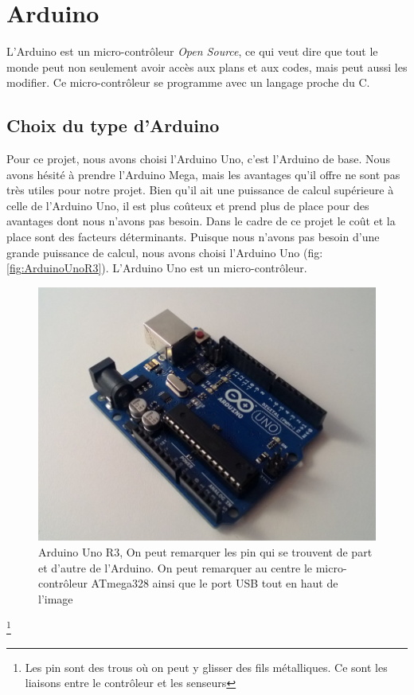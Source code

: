\documentclass[a4paper,11pt]{report}
\begin{document}
{\section{Arduino}
L'Arduino \label{Arduino} \cite{Arduino} est un micro-contrôleur \textit{Open Source}, ce qui veut dire que tout le monde peut non seulement avoir accès aux plans et aux codes, mais peut aussi les modifier. Ce micro-contrôleur se programme avec un langage proche du C. 


\subsection{Choix du type d'Arduino}
Pour ce projet, nous avons choisi l'Arduino Uno, c'est l'Arduino de base.  Nous avons hésité à prendre l'Arduino Mega, mais les avantages qu'il offre ne sont pas très utiles pour notre projet. Bien qu'il ait une puissance de calcul supérieure à celle de l'Arduino Uno, il est plus coûteux et prend plus de place pour des avantages dont nous n'avons pas besoin. Dans le cadre de ce projet le coût et la place sont des facteurs déterminants.  Puisque nous n'avons pas besoin d'une grande puissance de calcul, nous avons choisi l'Arduino Uno (fig: \ref{fig:ArduinoUnoR3}). L'Arduino Uno est un micro-contrôleur.\\

\begin{figure}[h]
\begin{center}
\includegraphics[scale=0.38]{arduino_uno.jpg}
\caption[Arduino Uno R3]{Arduino Uno R3\label{fig:ArduinoUnoR3}, On peut remarquer les pin  \label{pin} qui se trouvent de part et d'autre de l'Arduino. On peut remarquer au centre le micro-contrôleur ATmega328 ainsi que le port USB tout en haut de l'image}
\end{center}
\end{figure}\footnote{Les pin sont des trous où on peut y glisser des fils métalliques. Ce sont les liaisons entre le contrôleur et les senseurs}


}
\end{document}
